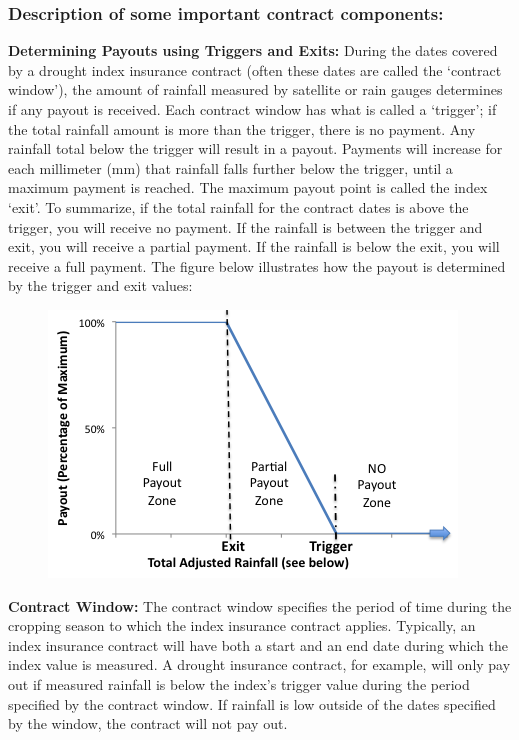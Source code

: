 \documentclass[letterpaper,10pt,english]{sphinxmanual}
\begin{document}
\subsubsection{Description of some important contract components:}
\label{whatisindexinsurance/understandingadroughtindex_en_Web:description-of-some-important-contract-components}
\textbf{Determining Payouts using Triggers and Exits:} During the dates covered by a drought index insurance contract (often these dates are called the ‘contract window’), the amount of rainfall measured by satellite or rain gauges determines if any payout is received. Each contract window has what is called a `trigger'; if the total rainfall amount is more than the trigger, there is no payment. Any rainfall total below the trigger will result in a payout. Payments will increase for each millimeter (mm) that rainfall falls further below the trigger, until a maximum payment is reached. The maximum payout point is called the index `exit'. To summarize, if the total rainfall for the contract dates is above the trigger, you will receive no payment. If the rainfall is between the trigger and exit, you will receive a partial payment. If the rainfall is below the exit, you will receive a full payment. The figure below illustrates how the payout is determined by the trigger and exit values:
\begin{figure}[htbp]
\centering

\includegraphics{chpt4ima1.png}
\end{figure}

\textbf{Contract Window:}  The contract window specifies the period of time during the cropping season to which the index insurance contract applies.  Typically, an index insurance contract will have both a start and an end date during which the index value is measured.  A drought insurance contract, for example, will only pay out if measured rainfall is below the index’s trigger value during the period specified by the contract window.  If rainfall is low outside of the dates specified by the window, the contract will not pay out.
\end{document}
